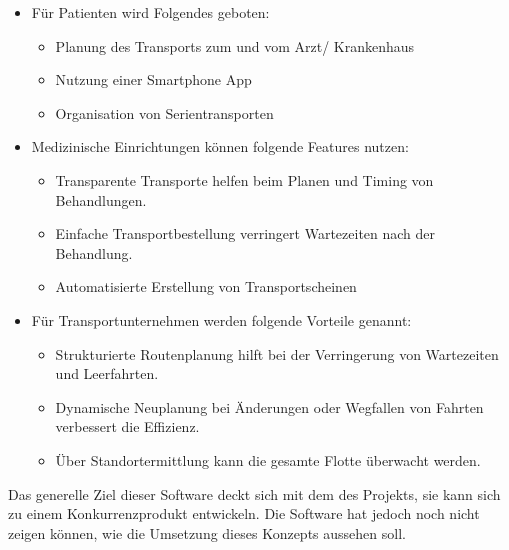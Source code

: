 \documentclass[a4paper, ngerman, 12pt]{scrartcl}
\begin{document}
\begin{itemize}
\item Für Patienten wird Folgendes geboten:
\begin{itemize}
\item Planung des Transports zum und vom Arzt/ Krankenhaus
\item Nutzung einer Smartphone App
\item Organisation von Serientransporten
\end{itemize}
\item Medizinische Einrichtungen können folgende Features nutzen:
\begin{itemize}
\item Transparente Transporte helfen beim Planen und Timing von Behandlungen.
\item Einfache Transportbestellung verringert Wartezeiten nach der Behandlung.
\item Automatisierte Erstellung von Transportscheinen
\end{itemize}
\item Für Transportunternehmen werden folgende Vorteile genannt:
\begin{itemize}
\item Strukturierte Routenplanung hilft bei der Verringerung von Wartezeiten und Leerfahrten.
\item Dynamische Neuplanung bei Änderungen oder Wegfallen von Fahrten verbessert die Effizienz.
\item Über Standortermittlung kann die gesamte Flotte überwacht werden.
\end{itemize}
\end{itemize}
Das generelle Ziel dieser Software deckt sich mit dem des Projekts, sie kann sich zu einem Konkurrenzprodukt entwickeln. Die Software hat jedoch noch nicht zeigen können, wie die Umsetzung dieses Konzepts aussehen soll.
\end{document}
